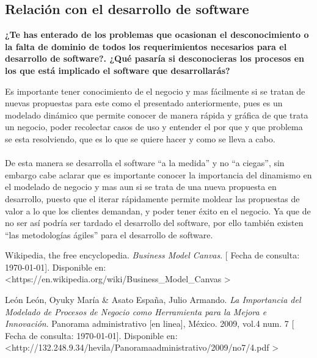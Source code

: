 \documentclass[spanish,12pt,letterpapper]{article}
\begin{document}
	\subsection{Relación con el desarrollo de software}
	
	\textbf{¿Te has enterado de los problemas que ocasionan el desconocimiento o la falta de dominio de todos los requerimientos necesarios para el desarrollo de software?. ¿Qué pasaría si desconocieras los procesos en los que está implicado el software que desarrollarás? \\}
	
	Es importante tener conocimiento de el negocio y mas fácilmente si se tratan de nuevas propuestas para este como el presentado anteriormente, pues es un modelado dinámico que permite conocer de manera rápida y gráfica de que trata un negocio, poder recolectar casos de uso y entender el por que y que problema se esta resolviendo, que es lo que se quiere hacer y como se lleva a cabo. \\ \\
	De esta manera se desarrolla el software ``a la medida'' y no ``a ciegas'', sin embargo cabe aclarar que es importante conocer la importancia del dinamismo en el modelado de negocio y mas aun si se trata de una nueva propuesta en desarrollo, puesto que el iterar rápidamente permite moldear las propuestas de valor a lo que los clientes demandan, y poder tener éxito en el negocio. Ya que de no ser así podría ser tardado el desarrollo del software, por ello también existen ``las metodologías ágiles'' para el desarrollo de software.
	
	\pagebreak
	\begin{thebibliography}{9}
		 Wikipedia, the free encyclopedia. 
		\emph{Business Model Canvas}. {[} Fecha de consulta: \today {]}. Disponible en: \textless https://en.wikipedia.org/wiki/Business\_Model\_Canvas \textgreater
		
		 León León, Oyuky María \& Asato España, Julio Armando. 
		\emph{La Importancia del Modelado de Procesos de
			Negocio como Herramienta para la Mejora e
			Innovación}. Panorama administrativo {[}en linea{]}, México. 2009, vol.4 num. 7  {[} Fecha de consulta: \today {]}. Disponible en: \textless http://132.248.9.34/hevila/Panoramaadministrativo/2009/no7/4.pdf \textgreater
	\end{thebibliography}
\end{document}
